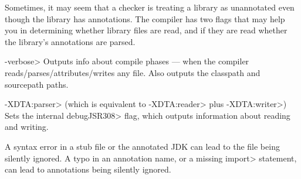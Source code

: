 Sometimes, it may seem that a checker is treating a library as unannotated
even though the library has annotations.  The compiler has two flags that
may help you in determining whether library files are read, and if they are
read whether the library's annotations are parsed.

\begin{description}
\item \<-verbose>
  Outputs info about compile phases --- when the compiler
  reads/parses/attributes/writes any file.  Also outputs the classpath and
  sourcepath paths.
\item \<-XDTA:parser> (which is equivalent to \<-XDTA:reader> plus \<-XDTA:writer>)
  Sets the internal \<debugJSR308> flag, which outputs information about
  reading and writing.
\end{description}

A syntax error in a stub file or the annotated JDK can lead to the file
being silently ignored.  A typo in an annotation name, or a missing
\<import> statement, can lead to annotations being silently ignored.


